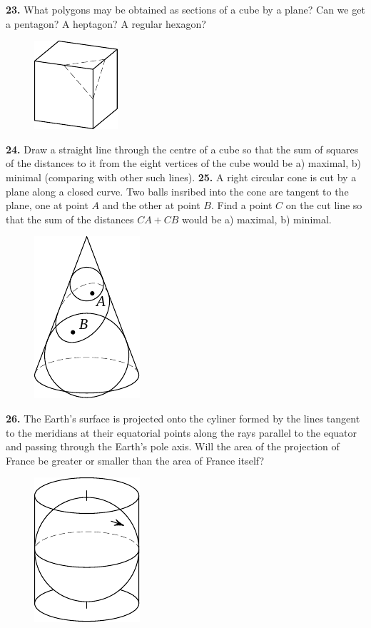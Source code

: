 \documentclass[12pt]{article}  %
\begin{document}
\newpage
\noindent
{\bf 23.} What polygons may be obtained as sections of a cube by a plane? Can we get a pentagon? A heptagon?
A regular hexagon?
\begin{figure}[h]
\centering
\footnotesize
\includegraphics[scale=1]{taskbook-7}
\end{figure}
\newline\newline\quad
{\bf 24.} Draw a straight line through the centre of a cube so that the sum of squares of the distances to it
from the eight vertices of the cube would be
a) maximal,
b) minimal (comparing with other such lines).
\newline\newline\quad
{\bf 25.} A right circular cone is cut by a plane along a closed curve. Two balls insribed into the cone
are tangent to the plane, one at point $A$ and the other at point $B$. Find a point $C$ on the cut line so
that the sum of the distances $CA + CB$ would be a) maximal, b) minimal.
\begin{figure}[h]
\centering
\footnotesize
\includegraphics[scale=1]{taskbook-9}
\end{figure}
\newline\newline\quad
{\bf 26.} The Earth's surface is projected onto the cyliner formed by the lines tangent to the meridians
at their equatorial points along the rays parallel to the equator and passing through the Earth's pole axis.
Will the area of the projection of France be greater or smaller than the area of France itself?
\begin{figure}[h]
\centering
\footnotesize
\includegraphics[scale=1]{taskbook-10}
\end{figure}
\end{document}
